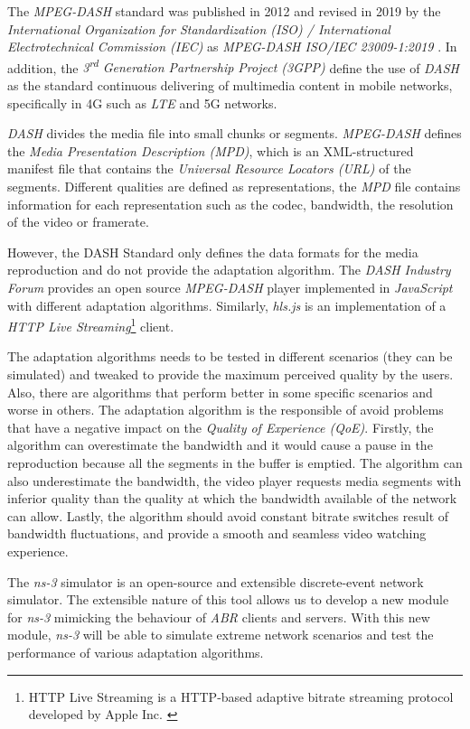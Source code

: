 The \textit{MPEG-DASH} standard was published in 2012 and revised in 2019 
by the \textit{International Organization for Standardization (ISO) / International 
Electrotechnical Commission (IEC)} as \textit{MPEG-DASH ISO/IEC 23009-1:2019}
\cite{ISO23009}. In addition, the \textit{3\textsuperscript{rd} Generation Partnership Project (3GPP)}
define the use of \textit{DASH} as the standard continuous delivering of multimedia
content in mobile networks, specifically in 4G such as \textit{LTE} and 5G networks.

\textit{DASH} divides the media file into small chunks or segments.
\textit{MPEG-DASH} defines the \textit{Media Presentation Description (MPD)}, 
which is an XML-structured manifest file that contains the \textit{Universal Resource 
Locators (URL)} of the segments. Different qualities are defined as representations,
the \textit{MPD} file contains information for each representation such as the
codec, bandwidth, the resolution of the video or framerate.

However, the DASH Standard \cite{ISO23009} only defines the data formats
for the media reproduction and do not provide the adaptation algorithm.
The \textit{DASH Industry Forum} \cite{dash2} provides an open source \textit{MPEG-DASH} 
player implemented in \textit{JavaScript} with different adaptation algorithms.
Similarly, \textit{hls.js} is an implementation of a \textit{HTTP Live Streaming}\footnote{HTTP
Live Streaming is a HTTP-based adaptive bitrate streaming protocol developed by Apple Inc.
 \cite{hls1}} client.

The adaptation algorithms needs to be tested in different scenarios (they can be simulated)
and tweaked to provide the maximum perceived quality by the users. Also, there are
algorithms that perform better in some specific scenarios and worse in others. The adaptation
algorithm is the responsible of avoid problems that have a negative impact
on the \textit{Quality of Experience (QoE)}. Firstly, the algorithm can overestimate
the bandwidth and it would cause a pause in the reproduction because all the 
segments in the buffer is emptied. The algorithm can also underestimate the bandwidth,
the video player requests media segments with inferior quality than the quality at which the 
bandwidth available of the network can allow. Lastly, the algorithm should avoid
constant bitrate switches result of bandwidth fluctuations, and provide a smooth and
seamless video watching experience.

The \textit{ns-3} simulator is an open-source and extensible discrete-event network simulator. 
The extensible nature of this tool allows us to develop a new module for \textit{ns-3}
mimicking the behaviour of \textit{ABR} clients and servers. With this new module, \textit{ns-3} 
will be able to simulate extreme network scenarios and test the performance of 
various adaptation algorithms.

